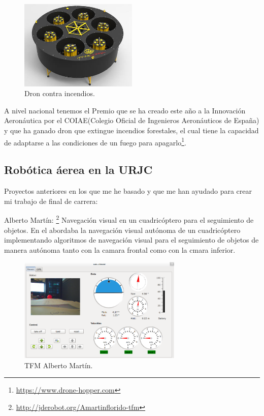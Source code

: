 \begin{figure}[H]
	\begin{center}
		\includegraphics[width=0.5\textwidth]{imag/IMG7.jpeg}
				\caption{Dron contra incendios.} 
	\label{fig:Dron Hopper.}	
	\end{center}
\end{figure}

\hspace{1cm} A nivel nacional tenemos el Premio que se ha creado este año a la Innovación Aeronáutica por el COIAE(Colegio Oficial de Ingenieros Aeronáuticos de España) y que ha ganado dron que extingue incendios forestales, el cual tiene la capacidad de adaptarse a las condiciones de un fuego para apagarlo\footnote{\url{https://www.drone-hopper.com}}.


\subsection{Robótica áerea en la URJC}
\hspace{1cm} Proyectos anteriores en los que me he basado y que me han ayudado para crear mi trabajo de final de carrera:

\hspace{1cm} Alberto Martín: \footnote{\url{http://jderobot.org/Amartinflorido-tfm}} Navegación visual en un cuadricóptero para el seguimiento de objetos. En el abordaba la navegación visual autónoma de un cuadricóptero implementando algoritmos de navegación visual para el seguimiento de objetos de manera autónoma tanto con la camara frontal como con la cmara inferior.

\begin{figure}[H]
	\begin{center}
		\includegraphics[width=0.7\textwidth]{imag/IMG8.png}
				\caption{TFM Alberto Martín.} 
	\label{fig:TFM Alberto M.}	
	\end{center}
\end{figure}

